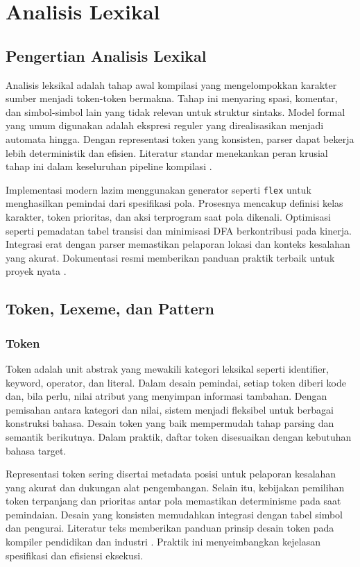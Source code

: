 \documentclass[../main.tex]{subfiles}
\begin{document}
\chapter{Analisis Lexikal}

\section{Pengertian Analisis Lexikal}
Analisis leksikal adalah tahap awal kompilasi yang mengelompokkan karakter sumber menjadi token-token bermakna. Tahap ini menyaring spasi, komentar, dan simbol-simbol lain yang tidak relevan untuk struktur sintaks. Model formal yang umum digunakan adalah ekspresi reguler yang direalisasikan menjadi automata hingga. Dengan representasi token yang konsisten, parser dapat bekerja lebih deterministik dan efisien. Literatur standar menekankan peran krusial tahap ini dalam keseluruhan pipeline kompilasi \citep{Mogensen2010,Wirth1996}.

Implementasi modern lazim menggunakan generator seperti \texttt{flex} untuk menghasilkan pemindai dari spesifikasi pola. Prosesnya mencakup definisi kelas karakter, token prioritas, dan aksi terprogram saat pola dikenali. Optimisasi seperti pemadatan tabel transisi dan minimisasi DFA berkontribusi pada kinerja. Integrasi erat dengan parser memastikan pelaporan lokasi dan konteks kesalahan yang akurat. Dokumentasi resmi memberikan panduan praktik terbaik untuk proyek nyata \citep{FlexManual}.

\section{Token, Lexeme, dan Pattern}
\subsection{Token}
Token adalah unit abstrak yang mewakili kategori leksikal seperti identifier, keyword, operator, dan literal. Dalam desain pemindai, setiap token diberi kode dan, bila perlu, nilai atribut yang menyimpan informasi tambahan. Dengan pemisahan antara kategori dan nilai, sistem menjadi fleksibel untuk berbagai konstruksi bahasa. Desain token yang baik mempermudah tahap parsing dan semantik berikutnya. Dalam praktik, daftar token disesuaikan dengan kebutuhan bahasa target.

Representasi token sering disertai metadata posisi untuk pelaporan kesalahan yang akurat dan dukungan alat pengembangan. Selain itu, kebijakan pemilihan token terpanjang dan prioritas antar pola memastikan determinisme pada saat pemindaian. Desain yang konsisten memudahkan integrasi dengan tabel simbol dan pengurai. Literatur teks memberikan panduan prinsip desain token pada kompiler pendidikan dan industri \citep{Mogensen2010,CS143}. Praktik ini menyeimbangkan kejelasan spesifikasi dan efisiensi eksekusi.
\end{document}
